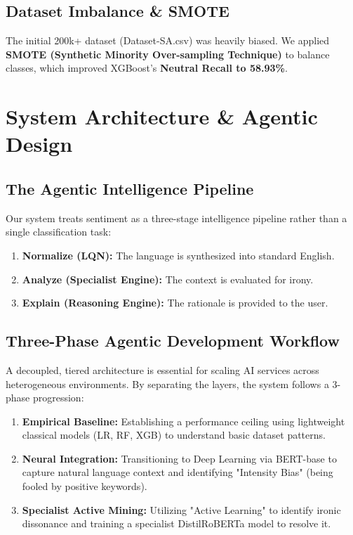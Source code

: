 \documentclass[11pt,oneside]{scrbook}
\begin{document}
\section{Dataset Imbalance \& SMOTE}
The initial 200k+ dataset (Dataset-SA.csv) was heavily biased. We applied \textbf{SMOTE (Synthetic Minority Over-sampling Technique)} to balance classes, which improved XGBoost's \textbf{Neutral Recall to 58.93\%}.

\cleardoublepage
\chapter{System Architecture \& Agentic Design}

\section{The Agentic Intelligence Pipeline}
Our system treats sentiment as a three-stage intelligence pipeline rather than a single classification task:
\begin{enumerate}
    \item \textbf{Normalize (LQN):} The language is synthesized into standard English.
    \item \textbf{Analyze (Specialist Engine):} The context is evaluated for irony.
    \item \textbf{Explain (Reasoning Engine):} The rationale is provided to the user.
\end{enumerate}

\section{Three-Phase Agentic Development Workflow}
A decoupled, tiered architecture is essential for scaling AI services across heterogeneous environments. By separating the layers, the system follows a 3-phase progression:
\begin{enumerate}
    \item \textbf{Empirical Baseline:} Establishing a performance ceiling using lightweight classical models (LR, RF, XGB) to understand basic dataset patterns.
    \item \textbf{Neural Integration:} Transitioning to Deep Learning via BERT-base to capture natural language context and identifying "Intensity Bias" (being fooled by positive keywords).
    \item \textbf{Specialist Active Mining:} Utilizing "Active Learning" to identify ironic dissonance and training a specialist DistilRoBERTa model to resolve it.
\end{enumerate}
\end{document}
